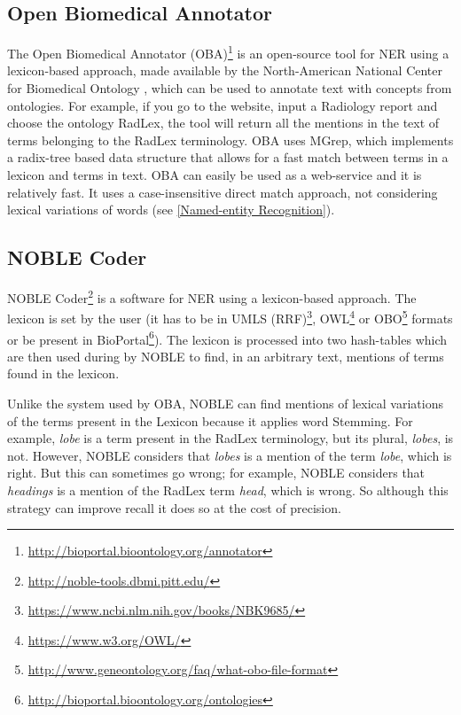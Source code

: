 \subsection{Open Biomedical Annotator}

The Open Biomedical Annotator (OBA)\footnote{\url{http://bioportal.bioontology.org/annotator}} is an open-source tool for NER using a lexicon-based approach, made available by the North-American National Center for Biomedical Ontology \citep{Jonquet2009}, which can be used to annotate text with concepts from ontologies. For example, if you go to the website, input a Radiology report and choose the ontology RadLex, the tool will return all the mentions in the text of terms belonging to the RadLex terminology. OBA uses MGrep, which implements a radix-tree based data structure that allows for a fast match between terms in a lexicon and terms in text. OBA can easily be used as a web-service and it is relatively fast. It uses a case-insensitive direct match approach, not considering lexical variations of words (see \ref{Named-entity Recognition}).

\subsection{NOBLE Coder}
\label{NOBLE Coder}

NOBLE Coder\footnote{\url{http://noble-tools.dbmi.pitt.edu/}} \citep{Tseytlin2016} is a software for NER using a lexicon-based approach. The lexicon is set by the user (it  has to be in UMLS (RRF)\footnote{\url{https://www.ncbi.nlm.nih.gov/books/NBK9685/}}, OWL\footnote{\url{https://www.w3.org/OWL/}} or OBO\footnote{\url{http://www.geneontology.org/faq/what-obo-file-format}} formats or be present in BioPortal\footnote{\url{http://bioportal.bioontology.org/ontologies}}). The lexicon is processed into two hash-tables which are then used during by NOBLE to find, in an arbitrary text, mentions of terms found in the lexicon.

Unlike the system used by OBA, NOBLE can find mentions of lexical variations of the terms present in the Lexicon because it applies word Stemming. For example, \textit{lobe} is a term present in the RadLex terminology, but its plural, \textit{lobes}, is not. However, NOBLE considers that \textit{lobes} is a mention of the term \textit{lobe}, which is right. But this can sometimes go wrong; for example, NOBLE considers that \textit{headings} is a mention of the RadLex term \textit{head}, which is wrong. So although this strategy can improve recall it does so at the cost of precision.

